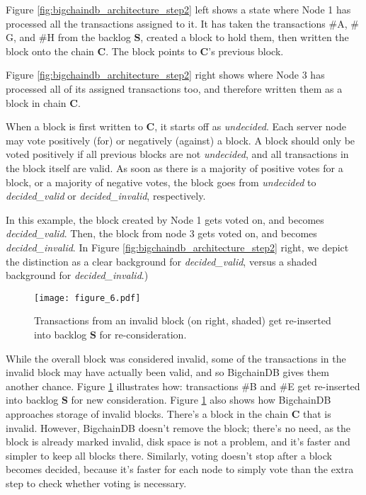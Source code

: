 Figure \ref{fig:bigchaindb_architecture_step2} left shows a state where Node 1 has processed all the transactions assigned to it.
It has taken the transactions \textsf{$\#$A}, \textsf{$\#$G}, and \textsf{$\#$H} from the backlog $\mathbf{S}$, created a block to hold them, then written the block onto the chain $\mathbf{C}$.
The block points to $\mathbf{C}$’s previous block.

Figure \ref{fig:bigchaindb_architecture_step2} right shows where Node 3 has processed all of its assigned transactions too, and therefore written them as a block in chain $\mathbf{C}$.

When a block is first written to $\mathbf{C}$, it starts off as \textsf{\textsf{\textit{undecided}}}.
Each server node may vote positively (for) or negatively (against) a block.
A block should only be voted positively if all previous blocks are not \textsf{\textit{undecided}}, and all transactions in the block itself are valid.
As soon as there is a majority of positive votes for a block, or a majority of negative votes, the block goes from \textsf{\textit{undecided}} to \textsf{\textit{decided\_valid}} or \textsf{\textit{decided\_invalid}}, respectively.

In this example, the block created by Node 1 gets voted on, and becomes \textsf{\textit{decided\_valid}}.
Then, the block from node 3 gets voted on, and becomes \textsf{\textit{decided\_invalid}}.
In Figure \ref{fig:bigchaindb_architecture_step2} right, we depict the distinction as a clear background for \textsf{\textit{decided\_valid}}, versus a shaded background for \textsf{\textit{decided\_invalid}}.)

\begin{figure}[!ht]
  \centering
  \texttt{[image: figure\_6.pdf]}
  \caption{Transactions from an invalid block (on right, shaded) get re-inserted into backlog $\mathbf{S}$ for re-consideration.}
  \label{fig:bigchaindb_architecture_step3}
\end{figure}

While the overall block was considered invalid, some of the transactions in the invalid block may have actually been valid, and so BigchainDB gives them another chance.
Figure \ref{fig:bigchaindb_architecture_step3} illustrates how: transactions \textsf{$\#$B} and \textsf{$\#$E} get re-inserted into backlog $\mathbf{S}$ for new consideration.
Figure \ref{fig:bigchaindb_architecture_step3} also shows how BigchainDB approaches storage of invalid blocks.
There’s a block in the chain $\mathbf{C}$ that is invalid.
However, BigchainDB doesn’t remove the block; there’s no need, as the block is already marked invalid, disk space is not a problem, and it’s faster and simpler to keep all blocks there.
Similarly, voting doesn’t stop after a block becomes decided, because it’s faster for each node to simply vote than the extra step to check whether voting is necessary.

